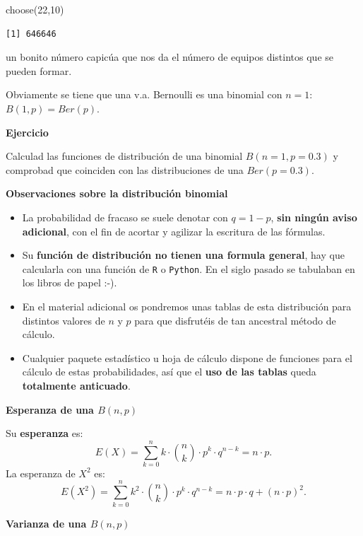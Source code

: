 \documentclass[
  letterpaper,
  DIV=11,
  numbers=noendperiod]{scrreprt}
\newenvironment{Shaded}{\begin{snugshade}}{\end{snugshade}}
\newcommand{\DecValTok}[1]{\textcolor[rgb]{0.68,0.00,0.00}{#1}}
\newcommand{\FunctionTok}[1]{\textcolor[rgb]{0.28,0.35,0.67}{#1}}
\newcommand{\NormalTok}[1]{\textcolor[rgb]{0.00,0.23,0.31}{#1}}
\providecommand{\tightlist}{%
  \setlength{\itemsep}{0pt}\setlength{\parskip}{0pt}}\usepackage{longtable,booktabs,array}
\begin{document}
\begin{Shaded}
\begin{Highlighting}[]
\FunctionTok{choose}\NormalTok{(}\DecValTok{22}\NormalTok{,}\DecValTok{10}\NormalTok{)}
\end{Highlighting}
\end{Shaded}

\begin{verbatim}
[1] 646646
\end{verbatim}

un bonito número capicúa que nos da el número de equipos distintos que
se pueden formar.

Obviamente se tiene que una v.a. Bernoulli es una binomial con \(n=1\):
\(B(1,p)=Ber(p).\)

\textbf{Ejercicio}

Calculad las funciones de distribución de una binomial \(B(n=1,p=0.3)\)
y comprobad que coinciden con las distribuciones de una \(Ber(p=0.3)\).

\textbf{Observaciones sobre la distribución binomial}

\begin{itemize}
\tightlist
\item
  La probabilidad de fracaso se suele denotar con \(q=1-p\), \textbf{sin
  ningún aviso adicional}, con el fin de acortar y agilizar la escritura
  de las fórmulas.
\item
  Su \textbf{función de distribución no tienen una formula general}, hay
  que calcularla con una función de \texttt{R} o \texttt{Python}. En el
  siglo pasado se tabulaban en los libros de papel :-).
\item
  En el material adicional os pondremos unas tablas de esta distribución
  para distintos valores de \(n\) y \(p\) para que disfrutéis de tan
  ancestral método de cálculo.
\item
  Cualquier paquete estadístico u hoja de cálculo dispone de funciones
  para el cálculo de estas probabilidades, así que el \textbf{uso de las
  tablas} queda \textbf{totalmente anticuado}.
\end{itemize}

\textbf{Esperanza de una \(B(n,p)\)}

Su \textbf{esperanza} es:
\[E(X)=\displaystyle\sum_{k=0}^n k \cdot  {n \choose k }\cdot p^k\cdot q^{n-k} = n\cdot p.\]
La esperanza de \(X^2\) es: \[
E(X^2)= \displaystyle\sum_{k=0}^n k^2 \cdot  {n \choose k }\cdot p^k\cdot q^{n-k}= n\cdot p\cdot q+(n\cdot p)^2.
\]

\textbf{Varianza de una \(B(n,p)\)}
\end{document}
